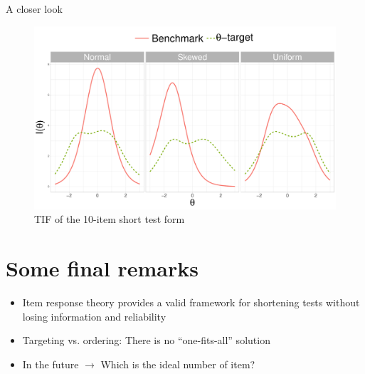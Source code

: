\documentclass{beamer} %
\begin{document}
\begin{frame}{A closer look}
	\begin{figure}
		\centering
		\includegraphics[width=.90\linewidth]{img/infoDetails.pdf}
		\caption{TIF of the 10-item short test form}
	\end{figure}
\end{frame}


\section[Final remarks]{Some final remarks}

\begin{frame}


\begin{itemize}

\item Item response theory provides a valid framework for shortening tests without losing information and reliability 

\vspace{1.5mm}

\item Targeting vs. ordering: There is no ``one-fits-all'' solution 

\vspace{1.5mm}

\item In the future $\rightarrow$ Which is the ideal number of item? 

\end{itemize}
\end{frame}
\end{document}
